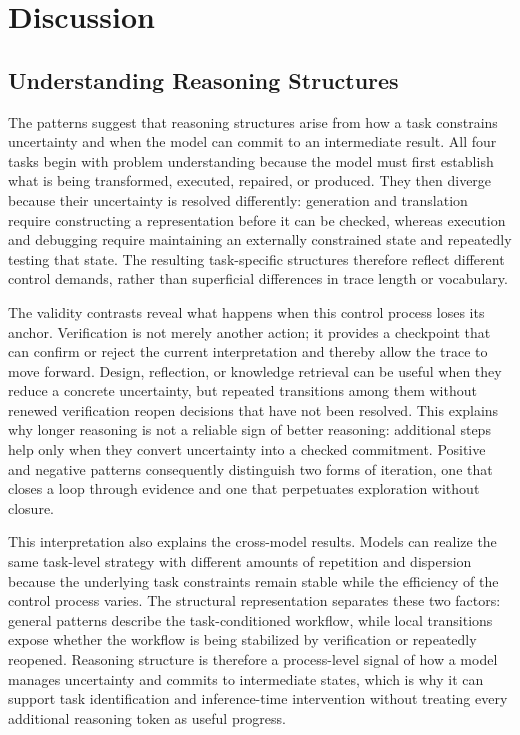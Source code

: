 \documentclass[acmsmall,screen,review,anonymous]{acmart}
\begin{document}
\section{Discussion}

\subsection{Understanding Reasoning Structures}

The patterns suggest that reasoning structures arise from how a task constrains uncertainty and when the model can commit to an intermediate result. All four tasks begin with problem understanding because the model must first establish what is being transformed, executed, repaired, or produced. They then diverge because their uncertainty is resolved differently: generation and translation require constructing a representation before it can be checked, whereas execution and debugging require maintaining an externally constrained state and repeatedly testing that state. The resulting task-specific structures therefore reflect different control demands, rather than superficial differences in trace length or vocabulary.

The validity contrasts reveal what happens when this control process loses its anchor. Verification is not merely another action; it provides a checkpoint that can confirm or reject the current interpretation and thereby allow the trace to move forward. Design, reflection, or knowledge retrieval can be useful when they reduce a concrete uncertainty, but repeated transitions among them without renewed verification reopen decisions that have not been resolved. This explains why longer reasoning is not a reliable sign of better reasoning: additional steps help only when they convert uncertainty into a checked commitment. Positive and negative patterns consequently distinguish two forms of iteration, one that closes a loop through evidence and one that perpetuates exploration without closure.

This interpretation also explains the cross-model results. Models can realize the same task-level strategy with different amounts of repetition and dispersion because the underlying task constraints remain stable while the efficiency of the control process varies. The structural representation separates these two factors: general patterns describe the task-conditioned workflow, while local transitions expose whether the workflow is being stabilized by verification or repeatedly reopened. Reasoning structure is therefore a process-level signal of how a model manages uncertainty and commits to intermediate states, which is why it can support task identification and inference-time intervention without treating every additional reasoning token as useful progress.
\end{document}
